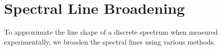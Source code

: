 
\chapter{Spectral Line Broadening} %

\label{AppendixB} %



To approximate the line shape of a discrete spectrum when measured experimentally, we broaden the spectral lines using various methods.




